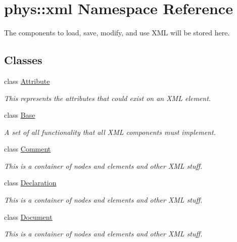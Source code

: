 \hypertarget{namespacephys_1_1xml}{
\section{phys::xml Namespace Reference}
\label{d9/d27/namespacephys_1_1xml}
}


The components to load, save, modify, and use XML will be stored here.  


\subsection*{Classes}
\begin{DoxyCompactItemize}
\item 
class \hyperlink{classphys_1_1xml_1_1Attribute}{Attribute}
\begin{DoxyCompactList}\small\item\em This represents the attributes that could exist on an XML element. \item\end{DoxyCompactList}\item 
class \hyperlink{classphys_1_1xml_1_1Base}{Base}
\begin{DoxyCompactList}\small\item\em A set of all functionality that all XML components must implement. \item\end{DoxyCompactList}\item 
class \hyperlink{classphys_1_1xml_1_1Comment}{Comment}
\begin{DoxyCompactList}\small\item\em This is a container of nodes and elements and other XML stuff. \item\end{DoxyCompactList}\item 
class \hyperlink{classphys_1_1xml_1_1Declaration}{Declaration}
\begin{DoxyCompactList}\small\item\em This is a container of nodes and elements and other XML stuff. \item\end{DoxyCompactList}\item 
class \hyperlink{classphys_1_1xml_1_1Document}{Document}
\begin{DoxyCompactList}\small\item\em This is a container of nodes and elements and other XML stuff. \item\end{DoxyCompactList}\item 

\end{DoxyCompactItemize}
